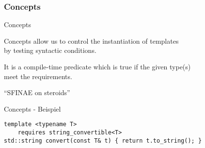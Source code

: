 \subsubsection{Concepts}

\begin{frame}{Concepts}
    \begin{center}
        Concepts allow us to control the instantiation of templates\\by testing syntactic conditions.

        \vspace{2.5em}

        It is a compile-time predicate which is true if the given type(s)\\meet the requirements.

        \vspace{2.5em}

        \enquote{SFINAE on steroids}
    \end{center}
\end{frame}

\begin{frame}[fragile]{Concepts - Beispiel}
    \begin{verbatim}
template <typename T>
    requires string_convertible<T>
std::string convert(const T& t) { return t.to_string(); }
    \end{verbatim}
\end{frame}